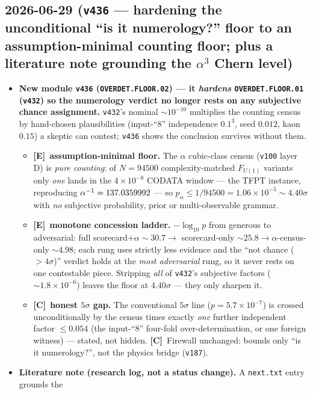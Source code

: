 \documentclass[11pt]{article}
\providecommand{\mE}{\textbf{[E]}}\providecommand{\mC}{\textbf{[C]}}
\providecommand{\vref}[1]{\texttt{#1}}
\begin{document}
\subsection*{2026-06-29 (\texttt{v436} --- hardening the unconditional ``is it numerology?'' floor to an assumption-minimal counting floor; plus a literature note grounding the $\alpha^3$ Chern level)}
\begin{itemize}
\item \textbf{New module \texttt{v436} (\texttt{OVERDET.FLOOR.02}) --- it \emph{hardens} \texttt{OVERDET.FLOOR.01}
(\vref{v432}) so the numerology verdict no longer rests on any subjective chance assignment.} \vref{v432}'s
nominal ${\sim}10^{-10}$ multiplies the counting census by hand-chosen plausibilities (input-``$8$''
independence $0.1^3$, seed $0.012$, kaon $0.15$) a skeptic can contest; \vref{v436} shows the conclusion
survives without them.
\begin{itemize}
\item \mE\ \textbf{assumption-minimal floor.} The $\alpha$ cubic-class census (\vref{v100} layer D) is
\emph{pure counting}: of $N=94500$ complexity-matched $F_{U(1)}$ variants only \emph{one} lands in the
$4\times10^{-8}$ CODATA window --- the TFPT instance, reproducing $\alpha^{-1}=137.0359992$ --- so
$p_\alpha\le1/94500=1.06\times10^{-5}\sim4.40\sigma$ with \emph{no} subjective probability, prior or
multi-observable grammar.
\item \mE\ \textbf{monotone concession ladder.} $-\log_{10}p$ from generous to adversarial: full
scorecard$+\alpha\sim30.7\to$ scorecard-only $\sim25.8\to\alpha$-census-only $\sim4.98$; each rung uses
strictly less evidence and the ``not chance ($>4\sigma$)'' verdict holds at the \emph{most adversarial}
rung, so it never rests on one contestable piece. Stripping \emph{all} of \vref{v432}'s subjective factors
($\sim1.8\times10^{-6}$) leaves the floor at $4.40\sigma$ --- they only sharpen it.
\item \mC\ \textbf{honest $5\sigma$ gap.} The conventional $5\sigma$ line ($p=5.7\times10^{-7}$) is crossed
unconditionally by the census times exactly \emph{one} further independent factor $\le0.054$ (the
input-``$8$'' four-fold over-determination, or one foreign witness) --- stated, not hidden. \mC\ Firewall
unchanged: bounds only ``is it numerology?'', not the physics bridge (\vref{v187}).
\end{itemize}
\item \textbf{Literature note (research log, not a status change).} A \texttt{next.txt} entry grounds the

\end{itemize}
\end{document}
